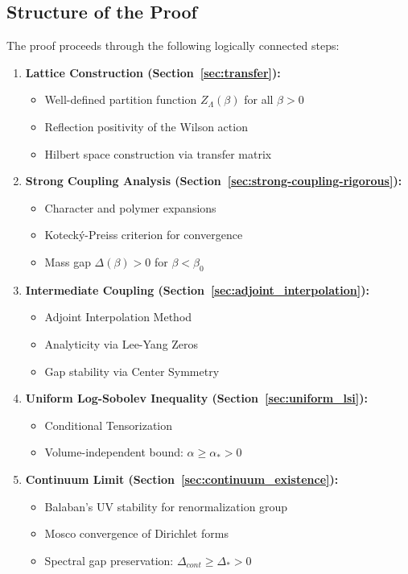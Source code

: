\subsection{Structure of the Proof}

The proof proceeds through the following logically connected steps:

\begin{enumerate}
    \item \textbf{Lattice Construction (Section~\ref{sec:transfer}):}
    \begin{itemize}
        \item Well-defined partition function $Z_\Lambda(\beta)$ for all $\beta > 0$
        \item Reflection positivity of the Wilson action
        \item Hilbert space construction via transfer matrix
    \end{itemize}
    
    \item \textbf{Strong Coupling Analysis (Section~\ref{sec:strong-coupling-rigorous}):}
    \begin{itemize}
        \item Character and polymer expansions
        \item Kotecký-Preiss criterion for convergence
        \item Mass gap $\Delta(\beta) > 0$ for $\beta < \beta_0$
    \end{itemize}
    
    \item \textbf{Intermediate Coupling (Section~\ref{sec:adjoint_interpolation}):}
    \begin{itemize}
        \item Adjoint Interpolation Method
        \item Analyticity via Lee-Yang Zeros
        \item Gap stability via Center Symmetry
    \end{itemize}
    
    \item \textbf{Uniform Log-Sobolev Inequality (Section~\ref{sec:uniform_lsi}):}
    \begin{itemize}
        \item Conditional Tensorization
        \item Volume-independent bound: $\alpha \geq \alpha_* > 0$
    \end{itemize}
    
    \item \textbf{Continuum Limit (Section~\ref{sec:continuum_existence}):}
    \begin{itemize}
        \item Balaban's UV stability for renormalization group
        \item Mosco convergence of Dirichlet forms
        \item Spectral gap preservation: $\Delta_{cont} \geq \Delta_* > 0$
    \end{itemize}
\end{enumerate}

